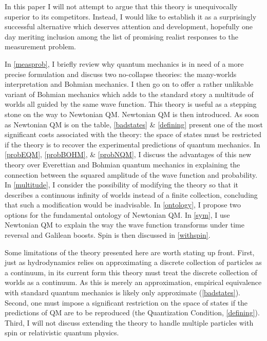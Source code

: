 \documentclass[12pt,secnumarabic,balancelastpage,amsmath,amssymb,nofootinbib]{article}
\begin{document}
In this paper I will not attempt to argue that this theory is unequivocally superior to its competitors.  Instead, I would like to establish it as a surprisingly successful alternative which deserves attention and development, hopefully one day meriting inclusion among the list of promising realist responses to the measurement problem.

In \textsection \ref{measprob}, I briefly review why quantum mechanics is in need of a more precise formulation and discuss two no-collapse theories: the many-worlds interpretation and Bohmian mechanics.  I then go on to offer a rather unlikable variant of Bohmian mechanics which adds to the standard story a multitude of worlds all guided by the same wave function.  This theory is useful as a stepping stone on the way to Newtonian QM.  Newtonian QM is then introduced.  As soon as Newtonian QM is on the table, \textsection \ref{badstates} \& \ref{defining} present one of the most significant costs associated with the theory: the space of states must be restricted if the theory is to recover the experimental predictions of quantum mechanics.  In \textsection \ref{probEQM}, \ref{probBOHM}, \& \ref{probNQM}, I discuss the advantages of this new theory over Everettian and Bohmian quantum mechanics in explaining the connection between the squared amplitude of the wave function and probability.  In \textsection \ref{multitude}, I consider the possibility of modifying the theory so that it describes a continuous infinity of worlds instead of a finite collection, concluding that such a modification would be inadvisable.  In \textsection \ref{ontology}, I propose two options for the fundamental ontology of Newtonian QM.  In \textsection \ref{sym}, I use Newtonian QM to explain the way the wave function transforms under time reversal and Galilean boosts.  Spin is then discussed in \textsection \ref{withspin}.

Some limitations of the theory presented here are worth stating up front.  First, just as hydrodynamics relies on approximating a discrete collection of particles as a continuum, in its current form this theory must treat the discrete collection of worlds as a continuum.  As this is merely an approximation, empirical equivalence with standard quantum mechanics is likely only approximate (\textsection \ref{badstates}).  Second, one must impose a significant restriction on the space of states if the predictions of QM are to be reproduced (the Quantization Condition, \textsection \ref{defining}).  Third, I will not discuss extending the theory to handle multiple particles with spin or relativistic quantum physics.
\end{document}
